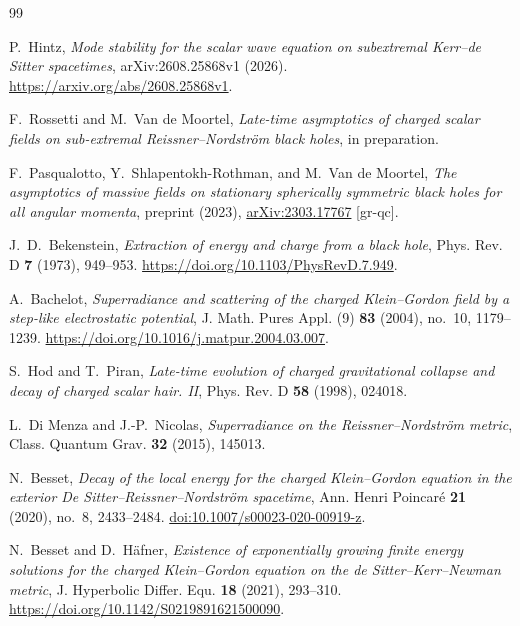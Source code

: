 \documentclass[11pt]{article}
\numberwithin{equation}{section}
\begin{document}
	\begin{thebibliography}{99}
		
		P.~Hintz,
		\emph{Mode stability for the scalar wave equation on subextremal
			Kerr--de Sitter spacetimes},
		arXiv:2608.25868v1 (2026).
		\url{https://arxiv.org/abs/2608.25868v1}.
		
		F.~Rossetti and M.~Van de Moortel,
		\emph{Late-time asymptotics of charged scalar fields on sub-extremal Reissner--Nordstr{\"o}m black holes},
		in preparation.
		
		F.~Pasqualotto, Y.~Shlapentokh-Rothman, and M.~Van de Moortel,
		\emph{The asymptotics of massive fields on stationary spherically symmetric black holes for all angular momenta},
		preprint (2023), \href{https://arxiv.org/abs/2303.17767}{arXiv:2303.17767} [gr-qc].
		
		J.~D.~Bekenstein,
		\emph{Extraction of energy and charge from a black hole},
		Phys. Rev. D \textbf{7} (1973), 949--953.
		\url{https://doi.org/10.1103/PhysRevD.7.949}.
		
		{
			A.~Bachelot,
			\emph{Superradiance and scattering of the charged Klein--Gordon field by a step-like electrostatic potential},
			J. Math. Pures Appl. (9) \textbf{83} (2004), no.~10, 1179--1239.
			\url{https://doi.org/10.1016/j.matpur.2004.03.007}.}
		
		S.~Hod and T.~Piran,
		\emph{Late-time evolution of charged gravitational collapse and
			decay of charged scalar hair. II},
		Phys. Rev. D \textbf{58} (1998), 024018.
		
		L.~Di Menza and J.-P.~Nicolas,
		\emph{Superradiance on the Reissner--Nordstr\"om metric},
		Class. Quantum Grav. \textbf{32} (2015), 145013.
		
		N.~Besset,
		\emph{Decay of the local energy for the charged Klein--Gordon equation in the exterior De Sitter--Reissner--Nordstr\"om spacetime},
		Ann. Henri Poincar\'e \textbf{21} (2020), no.~8, 2433--2484.
		\href{https://doi.org/10.1007/s00023-020-00919-z}{doi:10.1007/s00023-020-00919-z}.
		
		{
			N.~Besset and D.~H\"afner,
			\emph{Existence of exponentially growing finite energy solutions for the charged Klein--Gordon equation on the de Sitter--Kerr--Newman metric},
			J. Hyperbolic Differ. Equ. \textbf{18} (2021), 293--310.
			\url{https://doi.org/10.1142/S0219891621500090}.}
		

\end{thebibliography}
\end{document}
